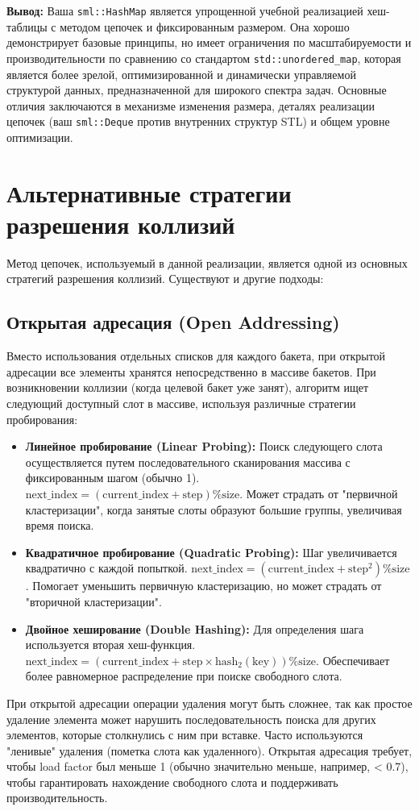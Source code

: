 \documentclass[a4paper,12pt]{article}
\begin{document}
\textbf{Вывод:}
Ваша \texttt{sml::HashMap} является упрощенной учебной реализацией хеш-таблицы с методом цепочек и фиксированным размером. Она хорошо демонстрирует базовые принципы, но имеет ограничения по масштабируемости и производительности по сравнению со стандартом \texttt{std::unordered\_map}, которая является более зрелой, оптимизированной и динамически управляемой структурой данных, предназначенной для широкого спектра задач. Основные отличия заключаются в механизме изменения размера, деталях реализации цепочек (ваш \texttt{sml::Deque} против внутренних структур STL) и общем уровне оптимизации.

\section{Альтернативные стратегии разрешения коллизий}

Метод цепочек, используемый в данной реализации, является одной из основных стратегий разрешения коллизий. Существуют и другие подходы:

\subsection{Открытая адресация (Open Addressing)}

Вместо использования отдельных списков для каждого бакета, при открытой адресации все элементы хранятся непосредственно в массиве бакетов. При возникновении коллизии (когда целевой бакет уже занят), алгоритм ищет следующий доступный слот в массиве, используя различные стратегии пробирования:
\begin{itemize}
    \item \textbf{Линейное пробирование (Linear Probing):} Поиск следующего слота осуществляется путем последовательного сканирования массива с фиксированным шагом (обычно 1). \( \text{next\_index} = (\text{current\_index} + \text{step}) \% \text{size} \). Может страдать от "первичной кластеризации", когда занятые слоты образуют большие группы, увеличивая время поиска.
    \item \textbf{Квадратичное пробирование (Quadratic Probing):} Шаг увеличивается квадратично с каждой попыткой. \( \text{next\_index} = (\text{current\_index} + \text{step}^2) \% \text{size} \). Помогает уменьшить первичную кластеризацию, но может страдать от "вторичной кластеризации".
    \item \textbf{Двойное хеширование (Double Hashing):} Для определения шага используется вторая хеш-функция. \( \text{next\_index} = (\text{current\_index} + \text{step} \times \text{hash}_2(\text{key})) \% \text{size} \). Обеспечивает более равномерное распределение при поиске свободного слота.
\end{itemize}
При открытой адресации операции удаления могут быть сложнее, так как простое удаление элемента может нарушить последовательность поиска для других элементов, которые столкнулись с ним при вставке. Часто используются "ленивые" удаления (пометка слота как удаленного). Открытая адресация требует, чтобы load factor был меньше 1 (обычно значительно меньше, например, < 0.7), чтобы гарантировать нахождение свободного слота и поддерживать производительность.
\end{document}
